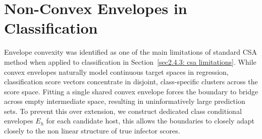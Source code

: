 
\section{Non-Convex Envelopes in Classification}
\label{sec3.2: non-convex envelopes}
Envelope convexity was identified as one of the main limitations of standard CSA method \cite{ochoarivera2024conformal} 
when applied to classification in Section~\ref{sec2.4.3: csa limitations}. While convex envelopes naturally model continuous 
target spaces in regression, classification score vectors concentrate in disjoint, class-specific clusters across the score 
space. Fitting a single shared convex envelope forces the boundary to bridge across empty intermediate space, resulting in 
uninformatively large prediction sets. To prevent this over extension, we construct dedicated class conditional envelopes 
$E_h$ for each candidate host, this allows the boundaries to closely adapt closely to the non linear structure of true 
infector scores.

